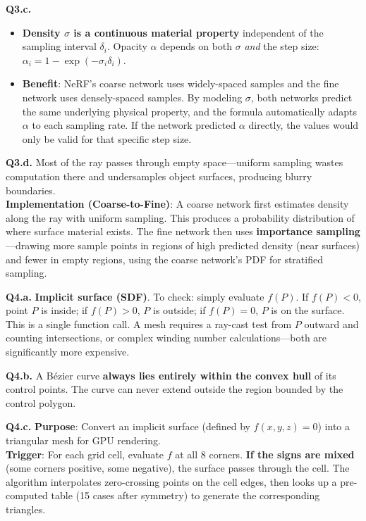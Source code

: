 \documentclass[11pt]{article}
\begin{document}
\vspace{0.75em}
\textbf{Q3.c.}
\begin{itemize}[leftmargin=2em, nosep]
\item \textbf{Density $\sigma$ is a continuous material property} independent of the sampling interval $\delta_i$. Opacity $\alpha$ depends on both $\sigma$ \textit{and} the step size: $\alpha_i = 1 - \exp(-\sigma_i \delta_i)$.
\item \textbf{Benefit}: NeRF's coarse network uses widely-spaced samples and the fine network uses densely-spaced samples. By modeling $\sigma$, both networks predict the same underlying physical property, and the formula automatically adapts $\alpha$ to each sampling rate. If the network predicted $\alpha$ directly, the values would only be valid for that specific step size.
\end{itemize}

\vspace{0.75em}
\textbf{Q3.d.} Most of the ray passes through empty space—uniform sampling wastes computation there and undersamples object surfaces, producing blurry boundaries.
\\
\textbf{Implementation (Coarse-to-Fine)}: A coarse network first estimates density along the ray with uniform sampling. This produces a probability distribution of where surface material exists. The fine network then uses \textbf{importance sampling}—drawing more sample points in regions of high predicted density (near surfaces) and fewer in empty regions, using the coarse network's PDF for stratified sampling.

\vspace{1em}

\textbf{Q4.a.} \textbf{Implicit surface (SDF)}. To check: simply evaluate $f(P)$. If $f(P)<0$, point $P$ is inside; if $f(P)>0$, $P$ is outside; if $f(P)=0$, $P$ is on the surface. This is a single function call. A mesh requires a ray-cast test from $P$ outward and counting intersections, or complex winding number calculations—both are significantly more expensive.

\vspace{0.75em}
\textbf{Q4.b.} A Bézier curve \textbf{always lies entirely within the convex hull} of its control points. The curve can never extend outside the region bounded by the control polygon.

\vspace{0.75em}
\textbf{Q4.c.} \textbf{Purpose}: Convert an implicit surface (defined by $f(x,y,z)=0$) into a triangular mesh for GPU rendering.
\\
\textbf{Trigger}: For each grid cell, evaluate $f$ at all 8 corners. \textbf{If the signs are mixed} (some corners positive, some negative), the surface passes through the cell. The algorithm interpolates zero-crossing points on the cell edges, then looks up a pre-computed table (15 cases after symmetry) to generate the corresponding triangles.
\end{document}
